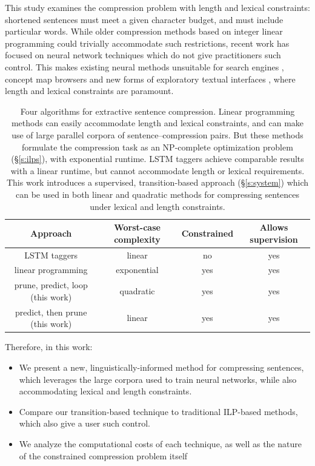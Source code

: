 \documentclass[11pt,a4paper]{article}
\begin{document}
This study examines the compression problem with length and lexical constraints: shortened sentences must meet a given character budget, and must include particular words. While older compression methods based on integer linear programming could trivially accommodate such restrictions, recent work has focused on neural network techniques \cite{filippova2015sentence} which do not give practitioners such control. This makes existing neural methods unsuitable for search engines \cite{hearst2009search}, concept map browsers \cite{falke2017graphdocexplore} and new forms of exploratory textual interfaces \cite{marchionini2006exploratory}, where length and lexical constraints are paramount. 




\begin{table}[htb!]
\begin{tabular}{cccc}
\textbf{Approach} & \textbf{Worst-case complexity} & \textbf{Constrained} & \textbf{Allows supervision} \\ \hline
LSTM taggers      & linear              & no     &    yes      \\   
linear programming              & exponential         & yes    &    yes   \\
prune, predict, loop  (this work)    & quadratic     & yes    &      yes   \\
predict, then prune  (this work)    & linear           & yes    &      yes   \\
\end{tabular}
\caption{Four algorithms for extractive sentence compression. Linear programming methods \cite{clarke2008global,filippova2013overcoming} can easily accommodate length and lexical constraints, and can make use of large parallel corpora of sentence--compression pairs. But these methods formulate the compression task as an NP-complete optimization problem (\S\ref{s:ilps}), with exponential runtime. LSTM taggers \cite{filippova2015sentence} achieve comparable results with a linear runtime, but cannot accommodate length or lexical requirements. This work introduces a supervised, transition-based approach (\S\ref{s:system}) which can be used in both linear and quadratic methods for compressing sentences under lexical and length constraints.}
\end{table}


Therefore, in this work:

\begin{itemize}
\item{We present a new, linguistically-informed method for compressing sentences, which leverages the large corpora used to train neural networks, while also accommodating lexical and length constraints.}
\item{Compare our transition-based technique to traditional ILP-based methods, which also give a user such control.}
\item{We analyze the computational costs of each technique, as well as the nature of the constrained compression problem itself}
\end{itemize}
\end{document}
